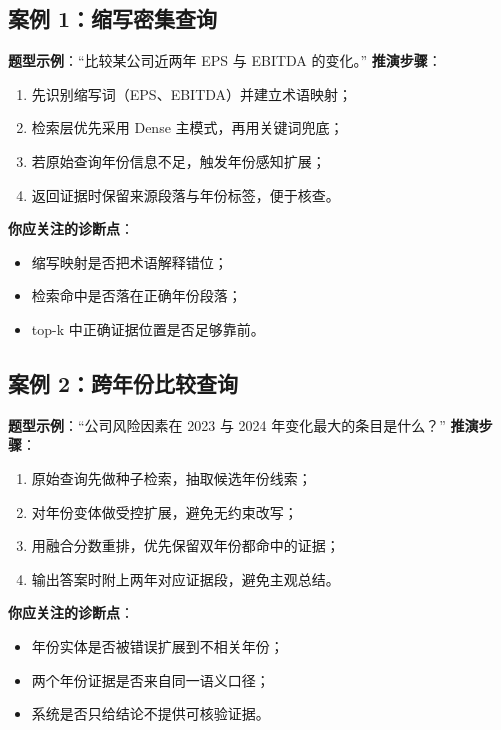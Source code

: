 \documentclass[UTF8,a4paper,12pt]{ctexart}
\begin{document}
\subsection*{案例 1：缩写密集查询}
\textbf{题型示例}：``比较某公司近两年 EPS 与 EBITDA 的变化。''  
\textbf{推演步骤}：
\begin{enumerate}
  \item 先识别缩写词（EPS、EBITDA）并建立术语映射；
  \item 检索层优先采用 Dense 主模式，再用关键词兜底；
  \item 若原始查询年份信息不足，触发年份感知扩展；
  \item 返回证据时保留来源段落与年份标签，便于核查。
\end{enumerate}
\textbf{你应关注的诊断点}：
\begin{itemize}
  \item 缩写映射是否把术语解释错位；
  \item 检索命中是否落在正确年份段落；
  \item top-k 中正确证据位置是否足够靠前。
\end{itemize}

\subsection*{案例 2：跨年份比较查询}
\textbf{题型示例}：``公司风险因素在 2023 与 2024 年变化最大的条目是什么？''  
\textbf{推演步骤}：
\begin{enumerate}
  \item 原始查询先做种子检索，抽取候选年份线索；
  \item 对年份变体做受控扩展，避免无约束改写；
  \item 用融合分数重排，优先保留双年份都命中的证据；
  \item 输出答案时附上两年对应证据段，避免主观总结。
\end{enumerate}
\textbf{你应关注的诊断点}：
\begin{itemize}
  \item 年份实体是否被错误扩展到不相关年份；
  \item 两个年份证据是否来自同一语义口径；
  \item 系统是否只给结论不提供可核验证据。
\end{itemize}
\end{document}
